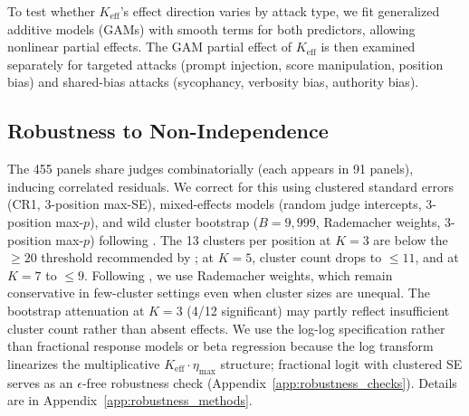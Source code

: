 To test whether $K_{\mathrm{eff}}$'s effect direction varies by attack type, we fit generalized additive models (GAMs) with smooth terms for both predictors, allowing nonlinear partial effects. The GAM partial effect of $K_{\mathrm{eff}}$ is then examined separately for targeted attacks (prompt injection, score manipulation, position bias) and shared-bias attacks (sycophancy, verbosity bias, authority bias).

\subsection{Robustness to Non-Independence}
\label{sec:robustness_method}

The 455 panels share judges combinatorially (each appears in 91 panels), inducing correlated residuals. We correct for this using clustered standard errors (CR1, 3-position max-SE), mixed-effects models (random judge intercepts, 3-position max-$p$), and wild cluster bootstrap ($B{=}9{,}999$, Rademacher weights, 3-position max-$p$) following \citet{cameron2008bootstrap}. The 13 clusters per position at $K{=}3$ are below the ${\geq}20$ threshold recommended by \citet{cameron2008bootstrap}; at $K{=}5$, cluster count drops to ${\leq}11$, and at $K{=}7$ to ${\leq}9$. Following \citet{mackinnon2018wild}, we use Rademacher weights, which remain conservative in few-cluster settings even when cluster sizes are unequal. The bootstrap attenuation at $K{=}3$ (4/12 significant) may partly reflect insufficient cluster count rather than absent effects. We use the log-log specification rather than fractional response models \citep{papke1996econometric} or beta regression \citep{ferrari2004beta} because the log transform linearizes the multiplicative $K_{\mathrm{eff}} \cdot \eta_{\max}$ structure; fractional logit with clustered SE serves as an $\epsilon$-free robustness check (Appendix~\ref{app:robustness_checks}). Details are in Appendix~\ref{app:robustness_methods}.

